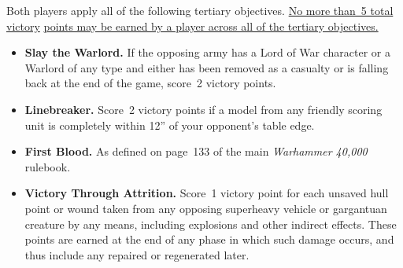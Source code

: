   Both players apply all of
the following tertiary objectives.  \underline{No more than~5 total
  victory} \underline{points may be earned by a player across all of
  the tertiary objectives.}

\begin{itemize}
\item \textbf{Slay the Warlord.}  If the opposing army has a Lord of
  War character or a Warlord of any type and either has been removed
  as a casualty or is falling back at the end of the game, score~2
  victory points.

\item \textbf{Linebreaker.}  Score~2 victory points if a model from
  any friendly scoring unit is completely within 12'' of your
  opponent's table edge.

\item \textbf{First Blood.}  As defined on page~133 of the main
  \emph{Warhammer 40,000} rulebook.

\item \textbf{Victory Through Attrition.}  Score~1 victory point for
  each unsaved hull point or wound taken from any opposing superheavy
  vehicle or gargantuan creature by any means, including explosions
  and other indirect effects.  These points are earned at the end of
  any phase in which such damage occurs, and thus include any repaired
  or regenerated later.
\end{itemize}
